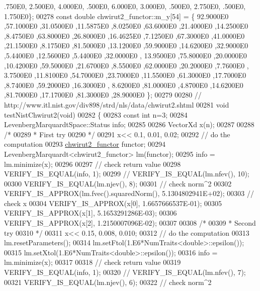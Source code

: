 \begin{DoxyCode}
       .750E0, 2.500E0, 4.000E0, .500E0, 6.000E0, 3.000E0, .500E0, 2.750E0, .500E0, 1.750E0\};
00278 \textcolor{keyword}{const} \textcolor{keywordtype}{double} chwirut2\_functor::m\_y[54] = \{ 92.9000E0 ,57.1000E0 ,31.0500E0 ,11.5875E0 ,8.0250E0 ,63.6000E0 
      ,21.4000E0 ,14.2500E0 ,8.4750E0 ,63.8000E0 ,26.8000E0 ,16.4625E0 ,7.1250E0 ,67.3000E0 ,41.0000E0 ,21.1500E0 
      ,8.1750E0 ,81.5000E0 ,13.1200E0 ,59.9000E0 ,14.6200E0 ,32.9000E0 ,5.4400E0 ,12.5600E0 ,5.4400E0 ,32.0000E0 ,
      13.9500E0 ,75.8000E0 ,20.0000E0 ,10.4200E0 ,59.5000E0 ,21.6700E0 ,8.5500E0 ,62.0000E0 ,20.2000E0 ,7.7600E0 ,
      3.7500E0 ,11.8100E0 ,54.7000E0 ,23.7000E0 ,11.5500E0 ,61.3000E0 ,17.7000E0 ,8.7400E0 ,59.2000E0 ,16.3000E0 ,
      8.6200E0 ,81.0000E0 ,4.8700E0 ,14.6200E0 ,81.7000E0 ,17.1700E0 ,81.3000E0 ,28.9000E0  \};
00279 
00280 \textcolor{comment}{// http://www.itl.nist.gov/div898/strd/nls/data/chwirut2.shtml}
00281 \textcolor{keywordtype}{void} testNistChwirut2(\textcolor{keywordtype}{void})
00282 \{
00283   \textcolor{keyword}{const} \textcolor{keywordtype}{int} n=3;
00284   LevenbergMarquardtSpace::Status info;
00285 
00286   VectorXd x(n);
00287 
00288   \textcolor{comment}{/*}
00289 \textcolor{comment}{   * First try}
00290 \textcolor{comment}{   */}
00291   x<< 0.1, 0.01, 0.02;
00292   \textcolor{comment}{// do the computation}
00293   \hyperlink{structchwirut2__functor}{chwirut2\_functor} functor;
00294   LevenbergMarquardt<chwirut2\_functor> lm(functor);
00295   info = lm.minimize(x);
00296 
00297   \textcolor{comment}{// check return value}
00298   VERIFY\_IS\_EQUAL(info, 1);
00299 \textcolor{comment}{//   VERIFY\_IS\_EQUAL(lm.nfev(), 10);}
00300   VERIFY\_IS\_EQUAL(lm.njev(), 8);
00301   \textcolor{comment}{// check norm^2}
00302   VERIFY\_IS\_APPROX(lm.fvec().squaredNorm(), 5.1304802941E+02);
00303   \textcolor{comment}{// check x}
00304   VERIFY\_IS\_APPROX(x[0], 1.6657666537E-01);
00305   VERIFY\_IS\_APPROX(x[1], 5.1653291286E-03);
00306   VERIFY\_IS\_APPROX(x[2], 1.2150007096E-02);
00307 
00308   \textcolor{comment}{/*}
00309 \textcolor{comment}{   * Second try}
00310 \textcolor{comment}{   */}
00311   x<< 0.15, 0.008, 0.010;
00312   \textcolor{comment}{// do the computation}
00313   lm.resetParameters();
00314   lm.setFtol(1.E6*NumTraits<double>::epsilon());
00315   lm.setXtol(1.E6*NumTraits<double>::epsilon());
00316   info = lm.minimize(x);
00317 
00318   \textcolor{comment}{// check return value}
00319   VERIFY\_IS\_EQUAL(info, 1);
00320 \textcolor{comment}{//   VERIFY\_IS\_EQUAL(lm.nfev(), 7);}
00321   VERIFY\_IS\_EQUAL(lm.njev(), 6);
00322   \textcolor{comment}{// check norm^2}

\end{DoxyCode}
